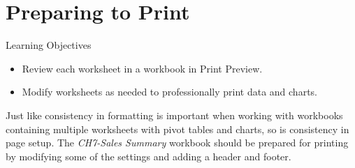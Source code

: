 \section{Preparing to Print}

\begin{center}
	\begin{objbox}{Learning Objectives}
		\begin{itemize}
			\setlength{\itemsep}{0pt}
			\setlength{\parskip}{0pt}
			\setlength{\parsep}{0pt}
			
			\item Review each worksheet in a workbook in Print Preview.
			\item Modify worksheets as needed to professionally print data and charts.
			
		\end{itemize}
	\end{objbox}
\end{center}

Just like consistency in formatting is important when working with workbooks containing multiple worksheets with pivot tables and charts,  so is consistency in page setup. The \textit{CH7-Sales Summary} workbook should be prepared for printing by modifying some of the settings and adding a header and footer. 


